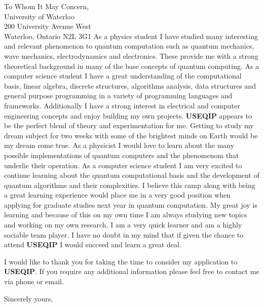 \documentclass{letter} %
\begin{document}
\begin{letter}{To Whom It May Concern, \\

 University of Waterloo\\
 200 University Avenue West \\
 Waterloo, Ontario  N2L 3G1}
\noindent As a physics student I have studied many interesting and relevant phenomenon to quantum computation such as quantum mechanics, wave mechanics, electrodynamics and electronics. These provide me with a strong theoretical background in many of the base concepts of quantum computing. As a computer science student I have a great understanding of the computational basis, linear algebra, discrete structures, algorithms analysis, data structures and general purpose programming in a variety of programming languages and frameworks. Additionally I have a strong interest in electrical and computer engineering concepts and enjoy building my own projects. \textbf{USEQIP} appears to be the perfect blend of theory and experimentation for me. Getting to study my dream subject for two weeks with some of the brightest minds on Earth would be my dream come true. As a physicist I would love to learn about the many possible implementations of quantum computers and the phenomenom that underlie their operation. As a computer science student I am very excited to continue learning about the quantum computational basis and the development of quantum algorithms and their complexities. I believe this camp along with being a great learning experience would place me in a very good position when applying for graduate studies next year in quantum computation. My great joy is learning and because of this on my own time I am always studying new topics and working on my own research. I am a very quick learner and am a highly sociable team player. I have no doubt in my mind that if given the chance to attend \textbf{USEQIP} I would succeed and learn a great deal. 
 
\noindent I would like to thank you for taking the time to consider my application to \textbf{USEQIP}. If you require any additional information please feel free to contact me via phone or email. 
\closing{Sincerely yours,} 
 

 

\end{letter}
 
\end{document}
